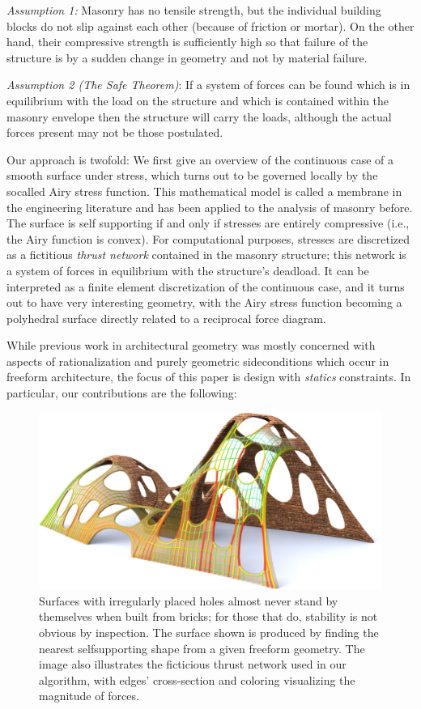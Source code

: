 \documentclass[review]{acmsiggraph}
\begin{document}
{\it Assumption 1:} Masonry has no tensile strength, but the individual 
building blocks do not slip against each other (because of friction or 
mortar). On the other hand, their compressive strength is sufficiently 
high so that failure of the structure is by a sudden change in geometry
and not by material failure.

{\it Assumption 2 (The Safe Theorem)}: If a system of forces can be found 
which is in equilibrium with the load on the structure and which is 
contained within the masonry envelope then the structure will carry the 
loads, although the actual forces present may not be those postulated.

Our approach is twofold: We first give an overview of the continuous case 
of a smooth surface under stress, which turns out to be governed locally by the 
so\dash called Airy stress function. This mathematical 
model is called a membrane in the engineering literature and has been 
applied to the analysis of masonry before. The surface is self\dash 
supporting if and only if stresses are entirely compressive (i.e., the 
Airy function is convex). For computational purposes, stresses are 
discretized as a fictitious {\em thrust network} \cite{Block07} contained 
in the masonry structure; this network is a system of forces in equilibrium with
the structure's deadload. It can be interpreted as a 
finite element discretization of the continuous case, and it turns out to 
have very interesting geometry, with the Airy stress function becoming a
polyhedral surface directly related to a reciprocal force diagram. 

While previous work in architectural geometry was mostly concerned
with aspects of rationalization and purely geometric side\dash conditions
which occur in freeform architecture, the focus of this paper is design with
{\em statics} constraints. In particular, our 
contributions are the following:


	\begin{figure}[t] 
	\includegraphics[width=\columnwidth]{arch-fig/cheesevault78.jpg} 
	\caption{Surfaces with irregularly placed holes almost 
never stand by themselves when built from bricks; for those that do,
stability is not obvious by inspection. The surface shown is produced by 
finding the nearest self\dash supporting shape from a given freeform
geometry. The image also illustrates
the ficticious thrust network used in our algorithm,
with edges' cross-section and coloring visualizing the magnitude of
forces.}
	\label{fig:cheese}
\end{figure}
\end{document}
